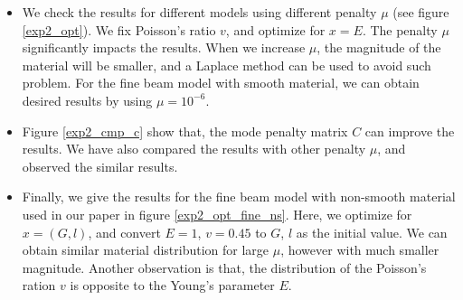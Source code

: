 \documentclass[9pt,twocolumn]{extarticle}
\begin{document}
\begin{itemize}
\item We check the results for different models using different penalty $\mu$
  (see figure \ref{exp2_opt}). We fix Poisson's ratio $v$, and optimize for
  $x=E$. The penalty $\mu$ significantly impacts the results. When we increase
  $\mu$, the magnitude of the material will be smaller, and a Laplace method can
  be used to avoid such problem. For the fine beam model with smooth material,
  we can obtain desired results by using $\mu=10^{-6}$.
\item Figure \ref{exp2_cmp_c} show that, the mode penalty matrix $C$ can improve
  the results. We have also compared the results with other penalty $\mu$, and
  observed the similar results. 
\item Finally, we give the results for the fine beam model with non-smooth
  material used in our paper in figure \ref{exp2_opt_fine_ns}. Here, we optimize
  for $x=(G,l)$, and convert $E=1$, $v=0.45$ to $G$, $l$ as the initial
  value. We can obtain similar material distribution for large $\mu$, however
  with much smaller magnitude. Another observation is that, the distribution of
  the Poisson's ration $v$ is opposite to the Young's parameter $E$.
\end{itemize}
\end{document}
